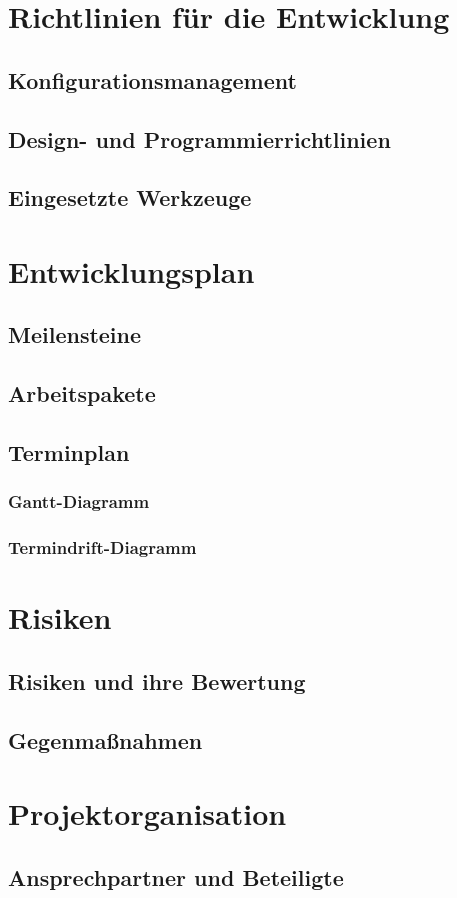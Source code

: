 \documentclass[11pt]{article}
\begin{document}
\section{Richtlinien für die Entwicklung}

\subsection{Konfigurationsmanagement}

\subsection{Design- und Programmierrichtlinien}

\subsection{Eingesetzte Werkzeuge}

\section{Entwicklungsplan}

\subsection{Meilensteine}

\subsection{Arbeitspakete}

\subsection{Terminplan}

\subsubsection{Gantt-Diagramm}

\subsubsection{Termindrift-Diagramm}

\section{Risiken}

\subsection{Risiken und ihre Bewertung}

\subsection{Gegenmaßnahmen}

\section{Projektorganisation}

\subsection{Ansprechpartner und Beteiligte}
\end{document}
